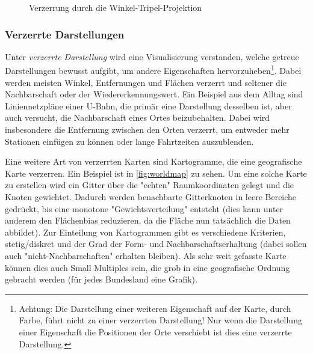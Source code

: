 					\begin{figure}
						\centering
						\def\svgwidth{\linewidth}
						
						\caption{Verzerrung durch die Winkel-Tripel-Projektion}
						\label{fig:winkeltripel}
					\end{figure}

			\subsubsection{Verzerrte Darstellungen}
				Unter \emph{verzerrte Darstellung} wird eine Visualisierung verstanden, welche getreue Darstellungen bewusst aufgibt, um andere Eigenschaften hervorzuheben\footnote{Achtung: Die Darstellung einer weiteren Eigenschaft auf der Karte, \zB durch Farbe, führt nicht zu einer verzerrten Darstellung! Nur wenn die Darstellung einer Eigenschaft die Positionen der Orte verschiebt ist dies eine verzerrte Darstellung.}. Dabei werden meisten Winkel, Entfernungen und Flächen verzerrt und seltener die Nachbarschaft oder der Wiedererkennungswert. Ein Beispiel aus dem Alltag sind Liniennetzpläne einer U-Bahn, die primär eine Darstellung desselben ist, aber auch versucht, die Nachbarschaft eines Ortes beizubehalten. Dabei wird insbesondere die Entfernung zwischen den Orten verzerrt, um entweder mehr Stationen einfügen zu können oder lange Fahrtzeiten auszublenden.

				Eine weitere Art von verzerrten Karten sind Kartogramme, die eine geografische Karte verzerren. Ein Beispiel ist in \autoref{fig:worldmap} zu sehen. Um eine solche Karte zu erstellen wird ein Gitter über die "echten" Raumkoordinaten gelegt und die Knoten gewichtet. Dadurch werden benachbarte Gitterknoten in leere Bereiche gedrückt, bis eine monotone "Gewichtsverteilung" entsteht (dies kann unter anderem den Flächenbias reduzieren, da die Fläche nun tatsächlich die Daten abbildet). Zur Einteilung von Kartogrammen gibt es verschiedene Kriterien, \zB stetig/diskret und der Grad der Form- und Nachbarschaftserhaltung (dabei sollen auch "nicht-Nachbarschaften" erhalten bleiben). Als sehr weit gefasste Karte können dies auch Small Multiples sein, die grob in eine geografische Ordnung gebracht werden (\zB für jedes Bundesland eine Grafik).

